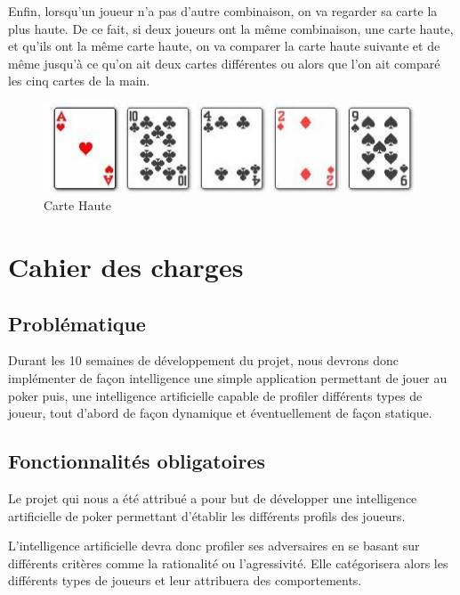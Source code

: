 \documentclass{report}
\begin{document}
Enfin, lorsqu'un joueur n'a pas d'autre combinaison, on va regarder sa carte la plus haute. De ce fait, si deux joueurs ont la même combinaison, une carte haute, et qu'ils ont la même carte haute, on va comparer la carte haute suivante et de même jusqu'à ce qu'on ait deux cartes différentes ou alors que l'on ait comparé les cinq cartes de la main. \par
		\begin{figure}[h]
			\begin{center}
				\includegraphics[scale=0.4]{./imagesRapport/carteHaute.jpg}
			\end{center}
			\caption[Carte Haute]{Carte Haute}
		\end{figure}
		\medskip

\section{Cahier des charges}
\subsection{Problématique}
\hspace{0.5cm}Durant les 10 semaines de développement du projet, nous devrons donc implémenter de façon intelligence une simple application permettant de jouer au poker puis, une intelligence artificielle capable de profiler différents types de joueur, tout d'abord de façon dynamique et éventuellement de façon statique. 
\subsection{Fonctionnalités obligatoires}

\hspace{0.5cm}Le projet qui nous a été attribué a pour but de développer une intelligence artificielle de poker permettant d'établir les différents profils des joueurs.\par
L'intelligence artificielle devra donc profiler ses adversaires en se basant sur différents critères comme la rationalité ou l'agressivité. Elle catégorisera alors les différents types de joueurs et leur attribuera des comportements.\\
\end{document}
